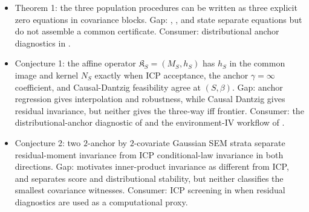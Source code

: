 \documentclass[11pt]{article}
\theoremstyle{definition}
\theoremstyle{plain}
\theoremstyle{remark}
\begin{document}
\begin{itemize}[leftmargin=*]
\item Theorem 1: the three population procedures can be written as three explicit zero equations in covariance blocks. Gap: \citet{PetersBuhlmannMeinshausen2016ICP}, \citet{RothenhauslerMeinshausenBuhlmannPeters2021Anchor}, and \citet{RothenhauslerBuhlmannMeinshausen2019CausalDantzig} state separate equations but do not assemble a common certificate. Consumer: distributional anchor diagnostics in \citet{KookSickBuhlmann2022DistributionalAnchor}.
\item Conjecture 1: the affine operator $\mathfrak K_S=(M_S,h_S)$ has $h_S$ in the common image and kernel $N_S$ exactly when ICP acceptance, the anchor $\gamma=\infty$ coefficient, and Causal-Dantzig feasibility agree at $(S,\beta)$. Gap: anchor regression gives interpolation and robustness, while Causal Dantzig gives residual invariance, but neither gives the three-way iff frontier. Consumer: the distributional-anchor diagnostic of \citet{KookSickBuhlmann2022DistributionalAnchor} and the environment-IV workflow of \citet{LongZhuDoHa2023IVEnvironments}.
\item Conjecture 2: two $2$-anchor by $2$-covariate Gaussian SEM strata separate residual-moment invariance from ICP conditional-law invariance in both directions. Gap: \citet[Section~2]{RothenhauslerBuhlmannMeinshausen2019CausalDantzig} motivates inner-product invariance as different from ICP, and \citet[Section~3]{KookSickBuhlmann2022DistributionalAnchor} separates score and distributional stability, but neither classifies the smallest covariance witnesses. Consumer: ICP screening in \citet{HeinzeDemlPetersMeinshausen2018NonlinearICP} when residual diagnostics are used as a computational proxy.
\end{itemize}
\end{document}
